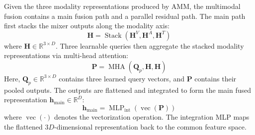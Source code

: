 \documentclass[letterpaper]{article} %
\begin{document}
Given the three modality representations produced by AMM, the
multimodal fusion contains a main fusion path and a parallel
residual path. The main path first stacks the mixer outputs along the
modality axis:
\begin{equation}
\mathbf{H}
=\operatorname{Stack}
  (\mathbf{H}^{V},
   \mathbf{H}^{A},
   \mathbf{H}^{T})
\label{eq:stacked_mixer_output}
\end{equation}
where $\mathbf{H}\in\mathbb{R}^{3\times D}$. Three learnable queries then aggregate the stacked modality representations via multi-head attention:
\begin{equation}
\mathbf{P}
=\operatorname{MHA}
  (\mathbf{Q}_{p},\mathbf{H},
   \mathbf{H})
\end{equation}
Here, $\mathbf{Q}_{p}\in\mathbb{R}^{3\times D}$ contains three learned
query vectors, and $\mathbf{P}$ contains their pooled outputs. The
outputs are flattened and integrated to form the main fused
representation $\mathbf{h}_{\mathrm{main}}\in\mathbb{R}^{D}$:
\begin{equation}
\mathbf{h}_{\mathrm{main}}
=\operatorname{MLP}_{\mathrm{int}}
  (\operatorname{vec}(\mathbf{P}))
\label{eq:main_fusion}
\end{equation}
where $\operatorname{vec}(\cdot)$ denotes the vectorization operation.
The integration MLP maps the flattened $3D$-dimensional representation
back to the common feature space.
\end{document}
